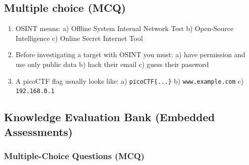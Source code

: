 \documentclass[12pt,openany]{book}
\begin{document}
\medskip

\subsection*{Multiple choice (MCQ)}


\begin{enumerate}

  \item OSINT means:
   a) Offline System Internal Network Test  b) Open-Source Intelligence  c) Online Secret Internet Tool

  \item Before investigating a target with OSINT you must:
   a) have permission and use only public data  b) hack their email  c) guess their password

  \item A picoCTF flag usually looks like:
   a) \texttt{picoCTF\{...\}}  b) \texttt{www.example.com}  c) \texttt{192.168.0.1}

\end{enumerate}

\medskip

\subsection*{Knowledge Evaluation Bank (Embedded Assessments)}


\subsubsection*{Multiple-Choice Questions (MCQ)}
\end{document}
